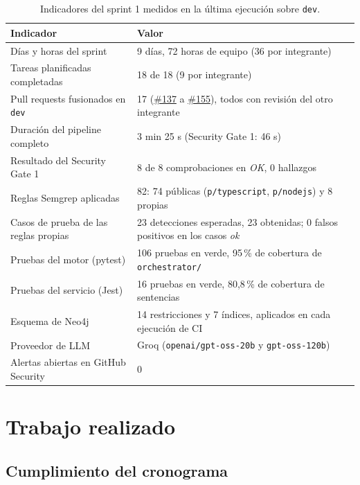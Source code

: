 \documentclass[11pt,a4paper]{report}
\newcommand{\pr}[1]{\href{https://github.com/PracticasESPE/Framework_Desarrollo_Seguro/pull/#1}{\##1}}
\begin{document}
\begin{table}[H]
\centering
\caption{Indicadores del sprint 1 medidos en la última ejecución sobre \texttt{dev}.}
\begin{tabularx}{\textwidth}{@{}P{6.2cm}L@{}}
\toprule
\textbf{Indicador} & \textbf{Valor}\\
\midrule
Días y horas del sprint & 9 días, 72 horas de equipo (36 por integrante)\\
Tareas planificadas completadas & 18 de 18 (9 por integrante)\\
Pull requests fusionados en \texttt{dev} & 17 (\pr{137} a \pr{155}), todos con revisión del otro integrante\\
Duración del pipeline completo & 3 min 25 s (Security Gate 1: 46 s)\\
Resultado del Security Gate 1 & 8 de 8 comprobaciones en \emph{OK}, 0 hallazgos\\
Reglas Semgrep aplicadas & 82: 74 públicas (\texttt{p/typescript}, \texttt{p/nodejs}) y 8 propias\\
Casos de prueba de las reglas propias & 23 detecciones esperadas, 23 obtenidas; 0 falsos positivos en los casos \emph{ok}\\
Pruebas del motor (pytest) & 106 pruebas en verde, 95\,\% de cobertura de \texttt{orchestrator/}\\
Pruebas del servicio (Jest) & 16 pruebas en verde, 80,8\,\% de cobertura de sentencias\\
Esquema de Neo4j & 14 restricciones y 7 índices, aplicados en cada ejecución de CI\\
Proveedor de LLM & Groq (\texttt{openai/gpt-oss-20b} y \texttt{gpt-oss-120b})\\
Alertas abiertas en GitHub Security & 0\\
\bottomrule
\end{tabularx}
\end{table}

\chapter{Trabajo realizado}

\section{Cumplimiento del cronograma}
\end{document}
